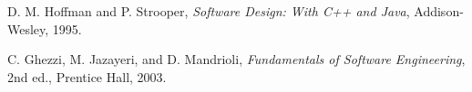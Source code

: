 \documentclass[12pt, titlepage]{article}
\begin{document}
\newpage

\begin{thebibliography}{9}

D. M. Hoffman and P. Strooper,
\textit{Software Design: With C++ and Java},
Addison-Wesley, 1995.

C. Ghezzi, M. Jazayeri, and D. Mandrioli,
\textit{Fundamentals of Software Engineering}, 2nd ed.,
Prentice Hall, 2003.

\end{thebibliography}
\end{document}
